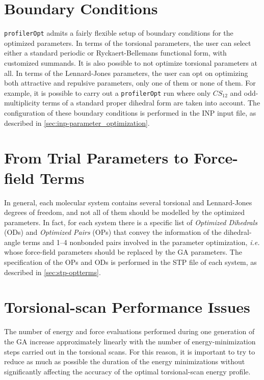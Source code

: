 \documentclass[10pt,a4paper,openany]{memoir}
\numberwithin{equation}{section}
\newcommand{\profileropt}[0]{\texttt{profilerOpt}}
\begin{document}
\section{Boundary Conditions}
\label{sec:ga-bound}

\profileropt{} admits a fairly flexible setup of boundary conditions
for the optimized parameters. In terms of the torsional parameters,
the user can select either a standard periodic or Ryckaert-Bellemans
functional form, with customized summands. It is also possible to not
optimize torsional parameters at all. In terms of the Lennard-Jones
parameters, the user can opt on optimizing both attractive and
repulsive parameters, only one of them or none of them. For example,
it is possible to carry out a \profileropt{} run where only $CS_{12}$
and odd-multiplicity terms of a standard proper dihedral form are
taken into account. The configuration of these boundary conditions is
performed in the INP input file, as described in
\autoref{sec:inp-parameter_optimization}.

\section{From Trial Parameters to Force-field Terms}
\label{sec:ga-opt-control}

In general, each molecular system contains several torsional and
Lennard-Jones degrees of freedom, and not all of them should be
modelled by the optimized parameters. In fact, for each system there
is a specific list of \textit{Optimized Dihedrals} (ODs) and
\textit{Optimized Pairs} (OPs) that convey the information of the
dihedral-angle terms and 1--4 nonbonded pairs involved in the
parameter optimization, \textit{i.e.} whose force-field parameters
should be replaced by the GA parameters. The specification of the OPs
and ODs is performed in the STP file of each system, as described in
\autoref{sec:stp-optterms}.

\section{Torsional-scan Performance Issues}
\label{sec:torsional-scan-performance-issues}

The number of energy and force evaluations performed during one
generation of the GA increase approximately linearly with the number
of energy-minimization steps carried out in the torsional scans.  For
this reason, it is important to try to reduce as much as possible the
duration of the energy minimizations without significantly affecting
the accuracy of the optimal torsional-scan energy profile.
\end{document}
